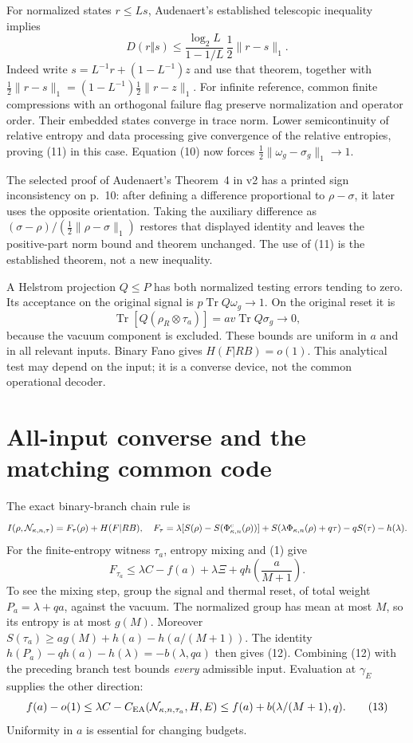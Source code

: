 \documentclass[11pt]{article}
\newcommand{\Tr}{\operatorname{Tr}}
\newcommand{\CEA}{C_{\mathrm{EA}}}
\newcommand{\PhiT}{\Phi_{\kappa,n}}
\begin{document}
For normalized states \(r\le Ls\), Audenaert's established telescopic
inequality \cite[Theorem~4]{audenaert} implies
\[
 D(r\Vert s)\le\frac{\log_2L}{1-1/L}\,
                    \frac12\|r-s\|_1.                      \tag{11}
\]
Indeed write \(s=L^{-1}r+(1-L^{-1})z\) and use that theorem, together
with \(\tfrac12\|r-s\|_1=(1-L^{-1})\tfrac12\|r-z\|_1\).
For infinite reference, common finite compressions with an orthogonal
failure flag preserve normalization and operator order. Their embedded
states converge in trace norm. Lower semicontinuity of relative entropy
and data processing give convergence of the relative entropies, proving
(11) in this case. Equation (10) now forces
\(\frac12\|\omega_g-\sigma_g\|_1\to1\).

The selected proof of Audenaert's Theorem~4 in v2 has a printed sign
inconsistency on p.~10: after defining a difference proportional to
\(\rho-\sigma\), it later uses the opposite orientation.
Taking the auxiliary difference as \((\sigma-\rho)/
(\tfrac12\|\rho-\sigma\|_1)\) restores that displayed identity and
leaves the positive-part norm bound and theorem unchanged.
The use of (11) is the established theorem, not a new inequality.

A Helstrom projection \(Q\le P\) has both normalized testing errors
tending to zero. Its acceptance on the original signal is
\(p\Tr Q\omega_g\to1\). On the original reset it is
\[
 \Tr[Q(\rho_R\otimes\tau_a)]=av\Tr Q\sigma_g\to0,
\]
because the vacuum component is excluded. These bounds are uniform in
\(a\) and in all relevant inputs. Binary Fano gives \(H(F|RB)=o(1)\).
This analytical test may depend on the input; it is a converse device,
not the common operational decoder.

\section{All-input converse and the matching common code}
The exact binary-branch chain rule is
\[
 I(\rho,{\cal N}_{\kappa,n,\tau})=F_\tau(\rho)+H(F|RB),
\quad
 F_\tau=\lambda[S(\rho)-S(\PhiT^c(\rho))]
 +S(\lambda\PhiT(\rho)+q\tau)-qS(\tau)-h(\lambda).
\]
For the finite-entropy witness \(\tau_a\), entropy mixing and (1) give
\[
 F_{\tau_a}\le\lambda C-f(a)+\lambda\Xi
                        +qh\!\left(\frac a{M+1}\right).
 \tag{12}
\]
To see the mixing step, group the signal and thermal reset, of total
weight \(P_a=\lambda+qa\), against the vacuum. The normalized group
has mean at most \(M\), so its entropy is at most \(g(M)\).
Moreover \(S(\tau_a)\ge ag(M)+h(a)-h(a/(M+1))\).
The identity \(h(P_a)-qh(a)-h(\lambda)=-b(\lambda,qa)\)
then gives (12).
Combining (12) with the preceding branch test bounds \emph{every}
admissible input. Evaluation at \(\gamma_E\) supplies the other direction:
\[
 f(a)-o(1)\le
 \lambda C-\CEA({\cal N}_{\kappa,n,\tau_a},H,E)
 \le f(a)+b(\lambda/(M+1),q).                               \tag{13}
\]
Uniformity in \(a\) is essential for changing budgets.
\end{document}
